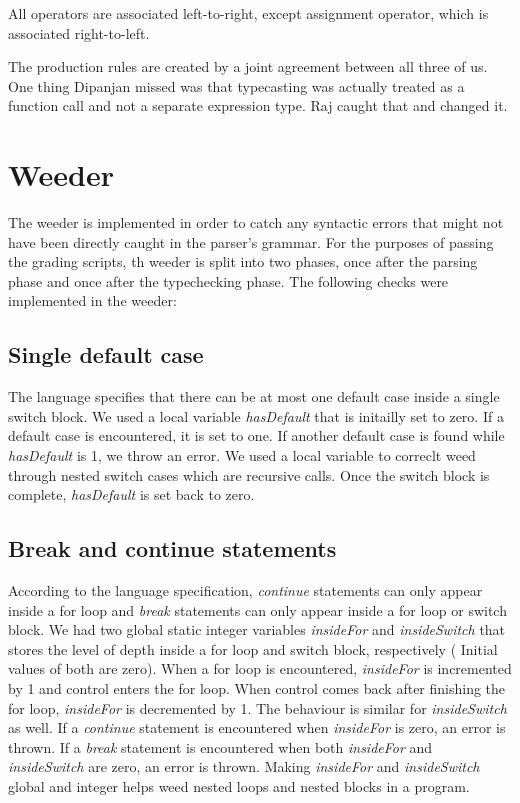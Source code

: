 \documentclass[a4paper]{article}
\begin{document}
All operators are associated left-to-right, except assignment operator, which is associated right-to-left.

The production rules are created by a joint agreement between all three of us. One thing Dipanjan missed was that typecasting was actually treated as a function call and not a separate expression type. Raj caught that and changed it. 


\section{Weeder}

The weeder is implemented in order to catch any syntactic errors that might not have been directly caught in the parser's grammar. For the purposes of passing the grading scripts, th weeder is split into two phases, once after the parsing phase and once after the typechecking phase. The following checks were implemented in the weeder:

\subsection{Single default case}
The language specifies that there can be at most one default case inside a single switch block. We used a local variable \textit{hasDefault} that is initailly set to zero. If a default case is encountered, it is set to one. If another default case is found while \textit{hasDefault} is 1, we throw an error. We used a local variable to correclt weed through nested switch cases which are recursive calls. Once the switch block is complete, \textit{hasDefault} is set back to zero.

\subsection{Break and continue statements}
According to the language specification, \textit{continue} statements can only appear inside a for loop and \textit{break} statements can only appear inside a for loop or switch block. We had two global static integer variables \textit{insideFor} and \textit{insideSwitch} that stores the level of depth inside a for loop and switch block, respectively ( Initial values of both are zero). When a for loop is encountered, \textit{insideFor} is incremented by 1 and control enters the for loop. When control comes back after finishing the for loop, \textit{insideFor} is decremented by 1. The behaviour is similar for \textit{insideSwitch} as well. If a \textit{continue} statement is encountered when \textit{insideFor} is zero, an error is thrown. If a \textit{break} statement is encountered when both \textit{insideFor} and \textit{insideSwitch} are zero, an error is thrown. Making \textit{insideFor} and \textit{insideSwitch} global and integer helps weed nested loops and nested blocks in a program.
\end{document}
